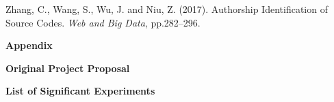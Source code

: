 \documentclass{report}
\begin{document}
Zhang, C., Wang, S., Wu, J. and Niu, Z. (2017). Authorship Identification of Source Codes. \textit{Web and Big Data}, pp.282–296.

\newpage
{}
\begin{center}
    \textbf{Appendix}
\end{center}

\begin{center}
    \textbf{Original Project Proposal}
\end{center}



\begin{center}
    \textbf{List of Significant Experiments}
\end{center}
\end{document}
